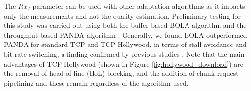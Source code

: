 The $Rx_{T}$ parameter can be used with other adaptation algorithms as it impacts only the measurements and not the quality estimation. Preliminary testing for this study was carried out using both the buffer-based BOLA algorithm and the throughput-based PANDA algorithm \cite{li2014probe}. Generally, we found BOLA outperformed PANDA for standard TCP and TCP Hollywood, in terms of stall avoidance and bit rate switching, a finding confirmed by previous studies \cite{karagkioules2017comparative}. Note that the main advantages of TCP Hollywood (shown in Figure \ref{fig:hollywood_download}) are the removal of head-of-line (HoL) blocking, and the addition of chunk request pipelining and these remain regardless of the algorithm used. 
